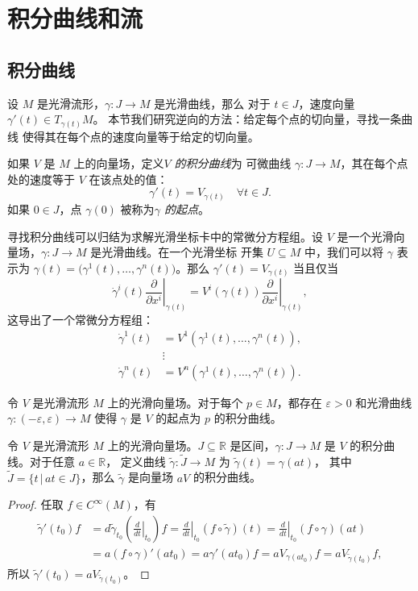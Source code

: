 
\chapter{积分曲线和流}

\section{积分曲线}

设 $M$ 是光滑流形，$\gamma:J\to M$ 是光滑曲线，那么
对于 $t\in J$，速度向量 $\gamma'(t)\in T_{\gamma(t)}M$。
本节我们研究逆向的方法：给定每个点的切向量，寻找一条曲线
使得其在每个点的速度向量等于给定的切向量。

如果 $V$ 是 $M$ 上的向量场，定义\emph{$V$ 的积分曲线}为
可微曲线 $\gamma:J\to M$，其在每个点处的速度等于 $V$ 在该点处的值：
\[
  \gamma'(t)=V_{\gamma(t)}\quad \forall t\in J.  
\]
如果 $0\in J$，点 $\gamma(0)$ 被称为\emph{$\gamma$ 的起点}。

寻找积分曲线可以归结为求解光滑坐标卡中的常微分方程组。设
$V$ 是一个光滑向量场，$\gamma:J\to M$ 是光滑曲线。在一个光滑坐标
开集 $U\subseteq M$ 中，我们可以将 $\gamma$ 表示为
$\gamma(t)=\bigl(\gamma^1(t),\dots,\gamma^n(t)\bigr)$。那么
$\gamma'(t)=V_{\gamma(t)}$ 当且仅当
\[
  \dot\gamma^i(t)\left.\frac{\partial}{\partial x^i}\right|_{\gamma(t)}  
  =V^i(\gamma(t))\left.\frac{\partial}{\partial x^i}\right|_{\gamma(t)} ,
\] 
这导出了一个常微分方程组：
\begin{align*}
  \dot\gamma^1(t)
  &=V^1(\gamma^1(t),\dots,\gamma^n(t)) ,\\
  &\vdots \\
  \dot\gamma^n(t)
  &=V^n(\gamma^1(t),\dots,\gamma^n(t)).
\end{align*}

\begin{proposition}
  令 $V$ 是光滑流形 $M$ 上的光滑向量场。对于每个 $p\in M$，都存在
  $\varepsilon>0$ 和光滑曲线 $\gamma:(-\varepsilon,\varepsilon)\to M$
  使得 $\gamma$ 是 $V$ 的起点为 $p$ 的积分曲线。
\end{proposition}

\begin{lemma}[缩放引理]
  令 $V$ 是光滑流形 $M$ 上的光滑向量场。$J\subseteq \mathbb{R}$
  是区间，$\gamma:J\to M$ 是 $V$ 的积分曲线。对于任意 $a\in \mathbb{R}$，
  定义曲线 $\tilde \gamma:\tilde{J}\to M$ 为 $\tilde{\gamma}(t)=\gamma(at)$，
  其中 $\tilde{J}=\{t\,|\, at\in J\}$，那么 $\tilde{\gamma}$ 是向量场
  $aV$ 的积分曲线。
\end{lemma}
\begin{proof}
  任取 $f\in C^\infty(M)$，有
  \begin{align*}
    \tilde{\gamma}'(t_0)f&=d\tilde{\gamma}_{t_0}\left(
      \left.\frac{d}{dt}\right|_{t_0}
    \right)f
    =\left.\frac{d}{dt}\right|_{t_0}(f\circ\tilde\gamma)(t)
    =\left.\frac{d}{dt}\right|_{t_0}(f\circ\gamma)(at)\\
    &=a (f\circ\gamma)'(at_0)
    =a\gamma'(at_0)f=aV_{\gamma(at_0)}f=
    aV_{\tilde{\gamma}(t_0)}f,
  \end{align*}
  所以 $\tilde{\gamma}'(t_0)=aV_{\tilde{\gamma}(t_0)}$。
\end{proof}

